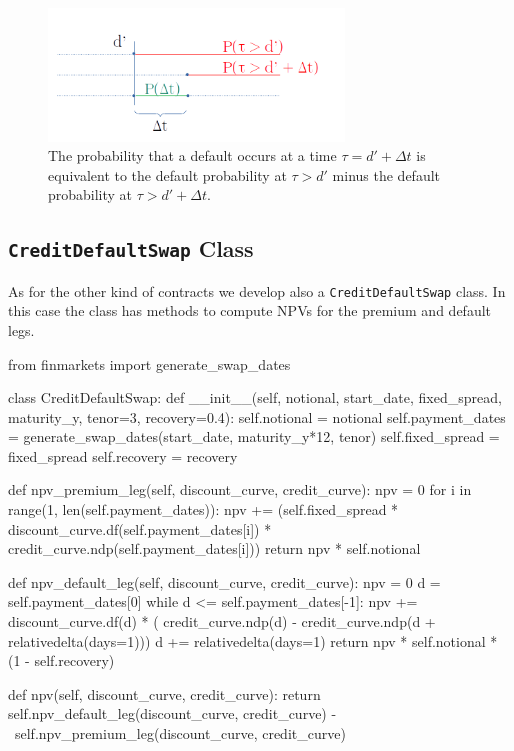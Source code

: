 \begin{figure}[htb]
	\centering
	\includegraphics[width=0.7\textwidth]{figures/timeline.png}
	\caption{The probability that a default occurs at a time $\tau = d'+\Delta t$ is equivalent to the default probability at $\tau > d'$ minus the default probability at $\tau>d'+\Delta t$.}
	\label{fig:default_p}
\end{figure}

\subsection{\texttt{CreditDefaultSwap} Class}

As for the other kind of contracts we develop also a \texttt{CreditDefaultSwap} class. In this case the class has methods to compute NPVs for the premium and default legs.

\begin{ipython}
from finmarkets import generate_swap_dates

class CreditDefaultSwap:
    def __init__(self, notional, start_date, fixed_spread,
                 maturity_y, tenor=3, recovery=0.4):
        self.notional = notional
        self.payment_dates = generate_swap_dates(start_date,
            maturity_y*12, tenor)
        self.fixed_spread = fixed_spread
        self.recovery = recovery

    def npv_premium_leg(self, discount_curve, credit_curve):
        npv = 0
        for i in range(1, len(self.payment_dates)):
            npv += (self.fixed_spread *
                discount_curve.df(self.payment_dates[i]) *
                credit_curve.ndp(self.payment_dates[i]))
        return npv * self.notional

    def npv_default_leg(self, discount_curve, credit_curve):
        npv = 0
        d = self.payment_dates[0]
        while d <= self.payment_dates[-1]:
            npv += discount_curve.df(d) * (
                credit_curve.ndp(d) -
                credit_curve.ndp(d + relativedelta(days=1)))
            d += relativedelta(days=1)
        return npv * self.notional * (1 - self.recovery)

    def npv(self, discount_curve, credit_curve):
        return self.npv_default_leg(discount_curve, credit_curve) - \
               self.npv_premium_leg(discount_curve, credit_curve)
\end{ipython}

